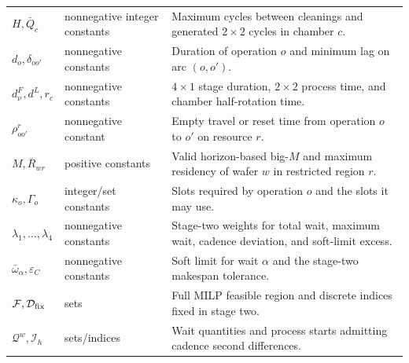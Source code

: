 \documentclass[final,5p,times,twocolumn]{elsarticle}
\begin{document}
\begin{table}[t]
\begin{tabular}{p{}p{}p{}}
$H,\bar Q_c$ & nonnegative integer constants & Maximum cycles between cleanings and generated $2\times2$ cycles in chamber $c$.\\
$d_o,\delta_{oo'}$ & nonnegative constants & Duration of operation $o$ and minimum lag on arc $(o,o')$.\\
$d^F_\nu,d^L,r_c$ & nonnegative constants & $4\times1$ stage duration, $2\times2$ process time, and chamber half-rotation time.\\
$\rho^r_{oo'}$ & nonnegative constant & Empty travel or reset time from operation $o$ to $o'$ on resource $r$.\\
$M,\overline R_{wr}$ & positive constants & Valid horizon-based big-$M$ and maximum residency of wafer $w$ in restricted region $r$.\\
$\kappa_o,\Gamma_o$ & integer/set constants & Slots required by operation $o$ and the slots it may use.\\
$\lambda_1,\ldots,\lambda_4$ & nonnegative constants & Stage-two weights for total wait, maximum wait, cadence deviation, and soft-limit excess.\\
$\bar\omega_\alpha,\varepsilon_C$ & nonnegative constants & Soft limit for wait $\alpha$ and the stage-two makespan tolerance.\\
$\mathcal F,\mathcal D_{\rm fix}$ & sets & Full MILP feasible region and discrete indices fixed in stage two.\\
$\mathcal Q^w,\mathcal I_h$ & sets/indices & Wait quantities and process starts admitting cadence second differences.\\
\bottomrule
\end{tabular}
\end{table}
\end{document}
